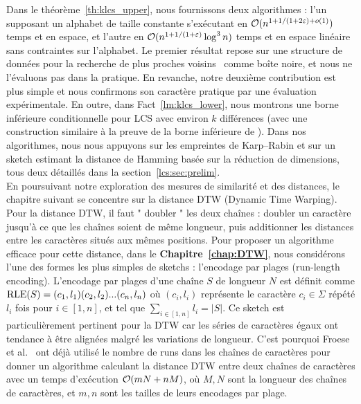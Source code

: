Dans le théorème~\ref{th:klcs_upper}, nous fournissons deux algorithmes : l'un supposant un alphabet de taille constante s'exécutant en $\mathcal{O}(n^{1+ 1/(1+2\varepsilon) + o(1)})$ temps et en espace, et l'autre en $\mathcal{O}(n^{1+1/(1+\varepsilon)} \log^3 n)$ temps et en espace linéaire sans contraintes sur l'alphabet. Le premier résultat repose sur une structure de données pour la recherche de plus proches voisins~\cite{DBLP:conf/stoc/AndoniR15} comme boîte noire, et nous ne l'évaluons pas dans la pratique. En revanche, notre deuxième contribution est plus simple et nous confirmons son caractère pratique par une évaluation expérimentale.
En outre, dans Fact~\ref{lm:klcs_lower}, nous montrons une borne inférieure conditionnelle pour LCS avec environ $k$ différences (avec une construction similaire à la preuve de la borne inférieure de \kLCS ).
Dans nos algorithmes, nous nous appuyons sur les empreintes de Karp--Rabin et sur un sketch estimant la distance de Hamming basée sur la réduction de dimensions, tous deux détaillés dans la section~\ref{lcs:sec:prelim}. \\


En poursuivant notre exploration des mesures de similarité et des distances, le chapitre suivant se concentre sur la distance DTW (Dynamic Time Warping).  Pour la distance DTW, il faut " doubler " les deux chaînes : doubler un caractère jusqu'à ce que les chaînes soient de même longueur, puis additionner les distances entre les caractères situés aux mêmes positions.
Pour proposer un algorithme efficace pour cette distance, dans le \textbf{Chapitre~\ref{chap:DTW}}, nous considérons l'une des formes les plus simples de sketchs : l'encodage par plages (run-length encoding). L'encodage par plages d'une chaîne $S$ de longueur $N$ est définit comme $\mathrm{RLE}(S)=(c_1,l_1)(c_2,l_2)... (c_n,l_n)$ où $(c_i,l_i)$ représente le caractère $c_i \in \Sigma$ répété $l_i$ fois pour $i \in [1,n]$, et tel que $\sum_{i\in [1,n]} l_i = |S|$.
Ce sketch est particulièrement pertinent pour la DTW car les séries de caractères égaux ont tendance à être alignées malgré les variations de longueur. C'est pourquoi Froese et al.~\cite{DBLP:journals/corr/abs-1903-03003} ont déjà utilisé le nombre de runs dans les chaînes de caractères pour donner un algorithme calculant la distance DTW entre deux chaînes de caractères avec un temps d'exécution $\mathcal{O}(mN+nM)$, où $M,N$ sont la longueur des chaînes de caractères, et $m, n$ sont les tailles de leurs encodages par plage.

